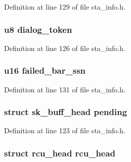 Definition at line 129 of file sta\-\_\-info.\-h.

\hypertarget{structtid__ampdu__tx_a6ad691d9e8c744adc654ff53c98502d2}{
\subsubsection[{dialog\-\_\-token}]{\setlength{\rightskip}{0pt plus 5cm}u8 dialog\-\_\-token}}\label{structtid__ampdu__tx_a6ad691d9e8c744adc654ff53c98502d2}


Definition at line 126 of file sta\-\_\-info.\-h.

\hypertarget{structtid__ampdu__tx_aeb33a4d1276de906633e672dbec23ba3}{
\subsubsection[{failed\-\_\-bar\-\_\-ssn}]{\setlength{\rightskip}{0pt plus 5cm}u16 failed\-\_\-bar\-\_\-ssn}}\label{structtid__ampdu__tx_aeb33a4d1276de906633e672dbec23ba3}


Definition at line 131 of file sta\-\_\-info.\-h.

\hypertarget{structtid__ampdu__tx_a6ef603b2ebc14267cfde5baf9f89b481}{
\subsubsection[{pending}]{\setlength{\rightskip}{0pt plus 5cm}struct sk\-\_\-buff\-\_\-head pending}}\label{structtid__ampdu__tx_a6ef603b2ebc14267cfde5baf9f89b481}


Definition at line 123 of file sta\-\_\-info.\-h.

\hypertarget{structtid__ampdu__tx_ab698383409a24791490f962fe6990655}{
\subsubsection[{rcu\-\_\-head}]{\setlength{\rightskip}{0pt plus 5cm}struct rcu\-\_\-head rcu\-\_\-head}}\label{structtid__ampdu__tx_ab698383409a24791490f962fe6990655}


